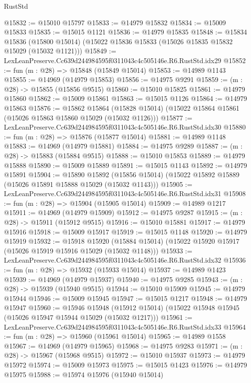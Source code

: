\begin{lexlean}{RustStd}
\begin{coremodule}
@15832 := @15010 @15797
@15833 := @14979 @15832
@15834 := @15009 @15833
@15835 := @15015 @1121
@15836 := @14979 @15835
@15848 := @15834
    @15836
    (@15800 @15014)
    (@15022 @15836 @15833 (@15026 @15835 @15832 @15029 (@15032 @1121)))
@15849 := LexLeanPreserve.Cc639d244984595f0311043c4c505146e.R6.RustStd.idx29
@15852 := fun (m : @28) => @15848 (@15849 @15014)
@15853 := @14989 @1143
@15855 := @14969 (@14979 @15853)
@15856 := @14975 @9291
@15859 := (m : @28) -> @15855 (@15856 @9515)
@15860 := @15010 @15825
@15861 := @14979 @15860
@15862 := @15009 @15861
@15863 := @15015 @1126
@15864 := @14979 @15863
@15876 := @15862
    @15864
    (@15828 @15014)
    (@15022 @15864 @15861 (@15026 @15863 @15860 @15029 (@15032 @1126)))
@15877 := LexLeanPreserve.Cc639d244984595f0311043c4c505146e.R6.RustStd.idx30
@15880 := fun (m : @28) => @15876 (@15877 @15014)
@15881 := @14989 @1148
@15883 := @14969 (@14979 @15881)
@15884 := @14975 @9289
@15887 := (m : @28) -> @15883 (@15884 @9515)
@15888 := @15010 @15853
@15889 := @14979 @15888
@15890 := @15009 @15889
@15891 := @15015 @1143
@15892 := @14979 @15891
@15904 := @15890
    @15892
    (@15856 @15014)
    (@15022 @15892 @15889 (@15026 @15891 @15888 @15029 (@15032 @1143)))
@15905 := LexLeanPreserve.Cc639d244984595f0311043c4c505146e.R6.RustStd.idx31
@15908 := fun (m : @28) => @15904 (@15905 @15014)
@15909 := @14989 @1217
@15911 := @14969 (@14979 @15909)
@15912 := @14975 @9287
@15915 := (m : @28) -> @15911 (@15912 @9515)
@15916 := @15010 @15881
@15917 := @14979 @15916
@15918 := @15009 @15917
@15919 := @15015 @1148
@15920 := @14979 @15919
@15932 := @15918
    @15920
    (@15884 @15014)
    (@15022 @15920 @15917 (@15026 @15919 @15916 @15029 (@15032 @1148)))
@15933 := LexLeanPreserve.Cc639d244984595f0311043c4c505146e.R6.RustStd.idx32
@15936 := fun (m : @28) => @15932 (@15933 @15014)
@15937 := @14989 @1423
@15939 := @14969 (@14979 @15937)
@15940 := @14975 @9285
@15943 := (m : @28) -> @15939 (@15940 @9515)
@15944 := @15010 @15909
@15945 := @14979 @15944
@15946 := @15009 @15945
@15947 := @15015 @1217
@15948 := @14979 @15947
@15960 := @15946
    @15948
    (@15912 @15014)
    (@15022 @15948 @15945 (@15026 @15947 @15944 @15029 (@15032 @1217)))
@15961 := LexLeanPreserve.Cc639d244984595f0311043c4c505146e.R6.RustStd.idx33
@15964 := fun (m : @28) => @15960 (@15961 @15014)
@15965 := @14989 @1558
@15967 := @14969 (@14979 @15965)
@15968 := @14975 @9283
@15971 := (m : @28) -> @15967 (@15968 @9515)
@15972 := @15010 @15937
@15973 := @14979 @15972
@15974 := @15009 @15973
@15975 := @15015 @1423
@15976 := @14979 @15975
@15988 := @15974
    @15976
    (@15940 @15014)

\end{coremodule}
\end{lexlean}
